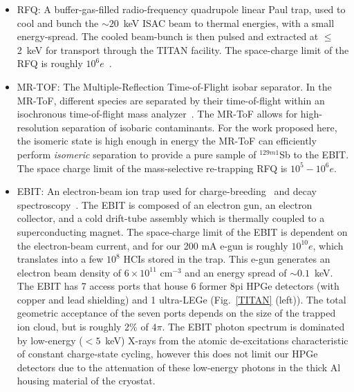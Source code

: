 \documentclass[12pt]{article}
\begin{document}
\begin{itemize}
\item RFQ: A buffer-gas-filled radio-frequency quadrupole linear Paul trap, used to cool and bunch the $\sim20$~keV ISAC beam to thermal energies, with a small energy-spread.  The cooled beam-bunch is then pulsed and extracted at $\leq$2~keV for transport through the TITAN facility.  The space-charge limit of the RFQ is roughly $10^6e$~\cite{Smi06}.
\item MR-TOF: The Multiple-Reflection Time-of-Flight isobar separator.  In the MR-ToF, different species are separated by their time-of-flight within an isochronous time-of-flight mass analyzer~\cite{Jes15}. The MR-ToF allows for high-resolution separation of isobaric contaminants.  For the work proposed here, the isomeric state is high enough in energy the MR-ToF can efficiently perform \textit{isomeric} separation to provide a pure sample of $^{129m1}$Sb to the EBIT.  The space charge limit of the mass-selective re-trapping RFQ is $10^5-10^6e$.
\item EBIT: An electron-beam ion trap used for charge-breeding~\cite{Lap10} and decay spectroscopy~\cite{Len14,Lea15,Lea15b,Lea15c,Lea17}.  The EBIT is composed of an electron gun, an electron collector, and a cold drift-tube assembly which is thermally coupled to a superconducting magnet.  The space-charge limit of the EBIT is dependent on the electron-beam current, and for our 200 mA e-gun is roughly $10^{10}e$, which translates into a few $10^8$ HCIs stored in the trap.  This e-gun generates an electron beam density of $6\times10^{11}$ cm$^{-3}$ and an energy spread of $\sim0.1$~keV.  The EBIT has 7 access ports that house 6 former 8pi HPGe detectors (with copper and lead shielding) and 1 ultra-LEGe (Fig.~\ref{TITAN} (left)).  The total geometric acceptance of the seven ports depends on the size of the trapped ion cloud, but is roughly 2\% of $4\pi$.  The EBIT photon spectrum is dominated by low-energy ($<5$~keV) X-rays from the atomic de-excitations characteristic of constant charge-state cycling, however this does not limit our HPGe detectors due to the attenuation of these low-energy photons in the thick Al housing material of the cryostat.
\end{itemize}
\end{document}
